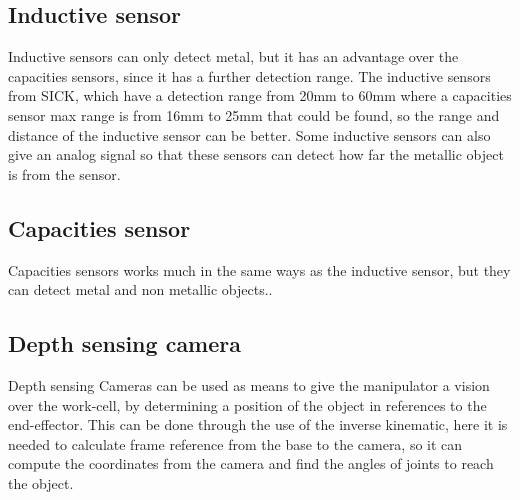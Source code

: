  \subsection{Inductive sensor}
 Inductive sensors can only detect metal, but it has an advantage over the capacities sensors, since it has a further detection range. The inductive sensors from SICK, which have a detection range from 20mm to 60mm \cite{SICKin} where a capacities sensor max range is from 16mm to 25mm \cite{SICKka} that could be found, so the range and distance of the inductive sensor can be better. Some inductive sensors can also give an analog signal so that these sensors can detect how far the metallic object is from the sensor\cite{SICKin}.\\ 

 \subsection{Capacities sensor} 
 Capacities sensors works much in the same ways as the inductive sensor, but they can detect metal and non metallic objects.\cite{SICKka}.\\

 \subsection{Depth sensing camera} \label{depthcam}
 Depth sensing Cameras can be used as means to give the manipulator a vision over the work-cell, by determining a position of the object in references to the end-effector\cite{cam}. This can be done through the use of the inverse kinematic, here it is needed to calculate frame reference from the base to the camera, so it can compute the coordinates from the camera and find the angles of joints to reach the object\cite{JohnC}.\\


 

